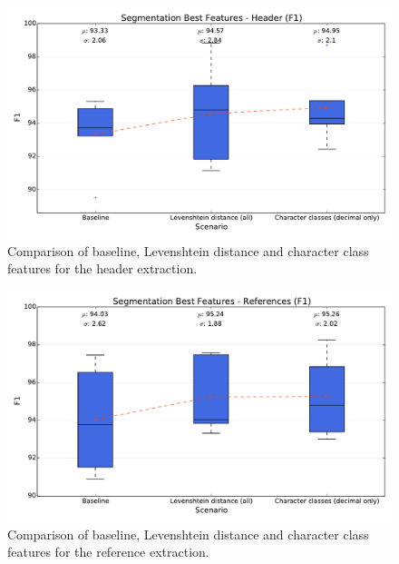 \begin{figure}[t]
\center
\includegraphics[width=5.5in]{Figures/header.pdf}
\caption{Comparison of baseline, Levenshtein distance and character class features for the header extraction.}
\label{fig:header}
\end{figure}

\begin{figure}[b]
\center
\includegraphics[width=5.5in]{Figures/references.pdf}
\caption{Comparison of baseline, Levenshtein distance and character class features for the reference extraction.}
\label{fig:references}
\end{figure}

